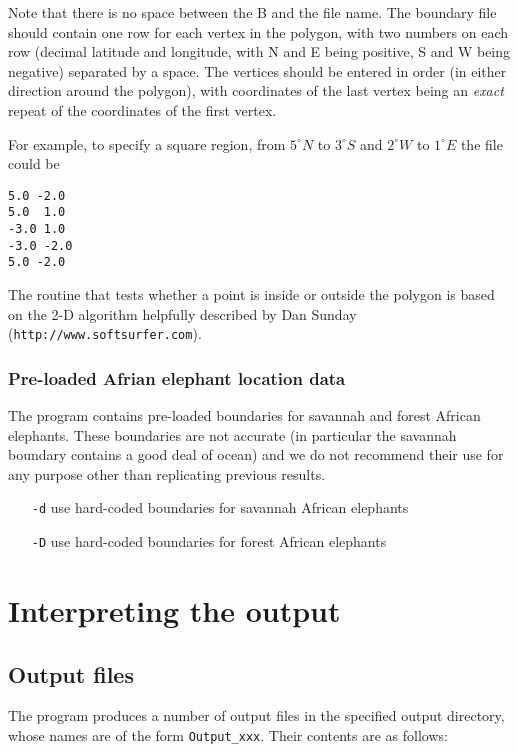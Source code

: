 \documentclass[10pt,titlepage,times,letterpaper]{article}
\begin{document}
Note that there is no space between the B and the file name.
The boundary file should contain one row for each vertex in the
polygon, with two numbers on each row (decimal latitude and longitude,
with N and E being positive, S and W being negative) separated by a
space. The vertices should be entered in order (in either direction
around the polygon), with coordinates of the last vertex being an {\it
exact} repeat of the coordinates of the first vertex.

For example, to specify a square region, from $5^\circ N$ to $3^\circ S$ and
$2^\circ W$ to $1^\circ E$ the file could be
\begin{verbatim}
5.0 -2.0
5.0  1.0
-3.0 1.0
-3.0 -2.0
5.0 -2.0
\end{verbatim}

The routine that tests whether a point is inside or outside the polygon
is based on the 2-D algorithm helpfully
described by Dan Sunday ({\tt http://www.softsurfer.com}). 

\subsubsection{Pre-loaded Afrian elephant location data}

The program contains pre-loaded boundaries for savannah and forest 
African elephants.  These boundaries are not accurate (in particular
the savannah boundary contains a good deal of ocean) and we do not
recommend their use for any purpose other than replicating previous
results.

\begin{itemize}
\item[{\tt -d}] use hard-coded boundaries for savannah African elephants
\item[{\tt -D}] use hard-coded boundaries for forest African elephants
\end{itemize}


\section{Interpreting the output} \label{interpret}

\subsection{Output files} \label{out}

The program produces a number of output files in the specified output directory,
whose names are of the form {\tt Output\_xxx}. Their
contents are as follows:
\end{document}
